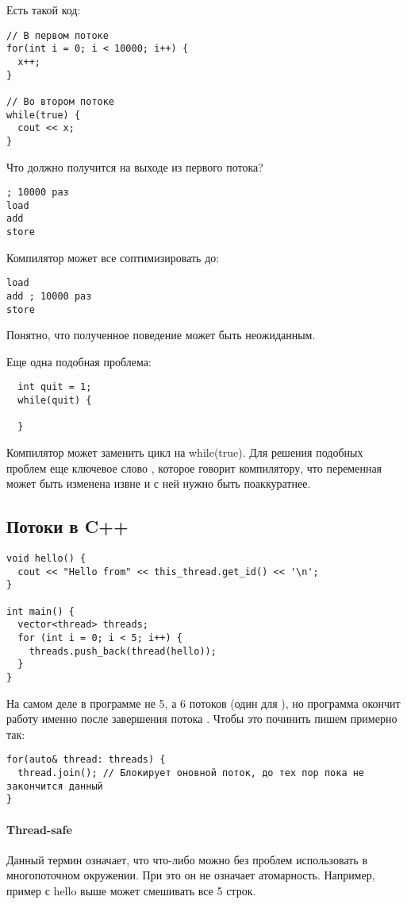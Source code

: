 Есть такой код:
\begin{verbatim}
// В первом потоке
for(int i = 0; i < 10000; i++) {
  x++;
}

// Во втором потоке
while(true) {
  cout << x;
}
\end{verbatim}

Что должно получится на выходе из первого потока?
\begin{verbatim}
; 10000 раз
load
add
store
\end{verbatim}

Компилятор может все соптимизировать до:
\begin{verbatim}
load
add ; 10000 раз
store
\end{verbatim}

Понятно, что полученное поведение может быть неожиданным.

Еще одна подобная проблема:
\begin{verbatim}
  int quit = 1;
  while(quit) {

  }
\end{verbatim}
Компилятор может заменить цикл на while(true). Для решения подобных проблем еще ключевое слово , которое говорит компилятору, что переменная может быть изменена извне и с ней нужно быть поаккуратнее.

\subsection{Потоки в C++}
\begin{verbatim}
void hello() {
  cout << "Hello from" << this_thread.get_id() << '\n';
}

int main() {
  vector<thread> threads;
  for (int i = 0; i < 5; i++) {
    threads.push_back(thread(hello));
  }
}
\end{verbatim}
На самом деле в программе не 5, а 6 потоков (один для ), но программа окончит работу именно после завершения потока . Чтобы это починить пишем примерно так:
\begin{verbatim}
for(auto& thread: threads) {
  thread.join(); // Блокирует оновной поток, до тех пор пока не закончится данный
}
\end{verbatim}

\paragraph{Thread-safe}
Данный термин означает, что что-либо можно без проблем использовать в многопоточном окружении. При это он не означает атомарность. Например, пример с hello выше может смешивать все 5 строк.

